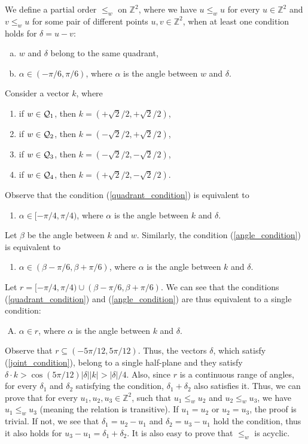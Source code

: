 \documentclass[11pt]{article}
\newcommand{\Z}{\mathbb{Z}}
\theoremstyle{plain}
\theoremstyle{definition}
\theoremstyle{remark}
\begin{document}
We define a partial order $\le_{w}$ on $\Z^2$, where we have $u \le_w u$ for every $u \in \Z^2$ and $v \le_w u$ for some pair of different points $u, v \in \Z^2$, when at least one condition holds for $\delta = u - v$:
\begin{enumerate}[a)]
	\item $w$ and $\delta$ belong to the same quadrant, \label{quadrant_condition}
	\item $\alpha \in (-\pi / 6, \pi / 6)$, where $\alpha$ is the angle between $w$ and $\delta$. \label{angle_condition}
\end{enumerate}
Consider a vector $k$, where
\begin{enumerate}[$1^\circ$]
	\item if $w \in \mathcal{Q}_1$, then $k = (+\sqrt{2} / 2, +\sqrt{2} / 2)$,
	\item if $w \in \mathcal{Q}_2$, then $k = (-\sqrt{2} / 2, +\sqrt{2} / 2)$,
	\item if $w \in \mathcal{Q}_3$, then $k = (-\sqrt{2} / 2, -\sqrt{2} / 2)$,
	\item if $w \in \mathcal{Q}_4$, then $k = (+\sqrt{2} / 2, -\sqrt{2} / 2)$.
\end{enumerate}
Observe that the condition (\ref{quadrant_condition}) is equivalent to
\begin{enumerate}[a')]
	\item $\alpha \in [-\pi / 4, \pi / 4)$, where $\alpha$ is the angle between $k$ and $\delta$.
\end{enumerate}
Let $\beta$ be the angle between $k$ and $w$. Similarly, the condition (\ref{angle_condition}) is equivalent to
\begin{enumerate}[b')]
	\item $\alpha \in (\beta - \pi / 6, \beta + \pi / 6)$, where $\alpha$ is the angle between $k$ and $\delta$. 
\end{enumerate}
Let $r = [-\pi / 4, \pi / 4) \cup (\beta - \pi / 6, \beta + \pi / 6)$. 
We can see that the conditions (\ref{quadrant_condition}) and (\ref{angle_condition}) are thus equivalent to a single condition:
\begin{enumerate}[A)]
	\item $\alpha \in r$, where $\alpha$ is the angle between $k$ and $\delta$. \label{joint_condition}
\end{enumerate}
Observe that $r \subseteq (-5 \pi / 12, 5 \pi / 12)$.
Thus, the vectors $\delta$, which satisfy (\ref{joint_condition}), belong to a single half-plane and they satisfy $\delta \cdot k > \cos(5\pi / 12)|\delta||k| > |\delta| / 4$.
Also, since $r$ is a continuous range of angles, for every $\delta_1$ and $\delta_2$ satisfying the condition, $\delta_1 + \delta_2$ also satisfies it.
Thus, we can prove that for every $u_1, u_2, u_3 \in \Z^2$, such that $u_1 \le_w u_2$ and $u_2 \le_w u_3$, we have $u_1 \le_w u_3$ (meaning the relation is transitive).
If $u_1 = u_2$ or $u_2 = u_3$, the proof is trivial. If not, we see that $\delta_1 = u_2 - u_1$ and $\delta_2 = u_3 - u_1$ hold the condition, 
thus it also holds for $u_3 - u_1 = \delta_1 + \delta_2$.
It is also easy to prove that $\le_w$ is acyclic.
\end{document}
